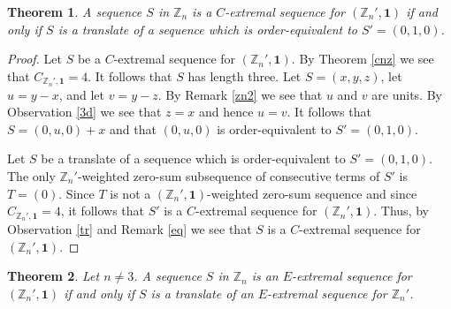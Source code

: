 \documentclass{article}[11pt]
\newtheorem{theorem}{Theorem}[section]
\theoremstyle{definition}
\begin{document}
\begin{theorem}\label{ecnz}
A sequence $S$ in $\mathbb Z_n$ is a $C$-extremal sequence for $(\mathbb Z_n',\mathbf 1)$ if and only if $S$ is a translate of a sequence which is order-equivalent to $S'=(0,1,0)$.
\end{theorem}

\begin{proof}
Let $S$ be a $C$-extremal sequence for $(\mathbb Z_n',\mathbf 1)$. By Theorem \ref{cnz} we see that $C_{\mathbb Z_n',\mathbf 1}=4$. It follows that $S$ has length three. Let $S=(x,y,z)$, let $u=y-x$, and let $v=y-z$. By Remark \ref{zn2} we see that $u$ and $v$ are units. By Observation \ref{3d} we see that $z=x$ and hence $u=v$.  It follows that $S=(0,u,0)+x$ and that $(0,u,0)$ is order-equivalent to $S'=(0,1,0)$.

Let $S$ be a translate of a sequence which is order-equivalent to $S'=(0,1,0)$. The only $\mathbb Z_n'$-weighted zero-sum subsequence of consecutive terms of $S'$ is $T=(0)$. Since $T$ is not a $(\mathbb Z_n',\mathbf 1)$-weighted zero-sum sequence and since $C_{\mathbb Z_n',\mathbf 1}=4$, it follows that $S'$ is a $C$-extremal sequence for $(\mathbb Z_n',\mathbf 1)$. Thus, by Observation \ref{tr} and Remark \ref{eq} we see that $S$ is a $C$-extremal sequence for $(\mathbb Z_n',\mathbf 1)$.
\end{proof}


\begin{theorem}\label{eenz}
Let $n\neq 3$. A sequence $S$ in $\mathbb Z_n$ is an $E$-extremal sequence for $(\mathbb Z_n',\mathbf 1)$ if and only if $S$ is a translate of an $E$-extremal sequence for $\mathbb Z_n'$.
\end{theorem}
\end{document}
